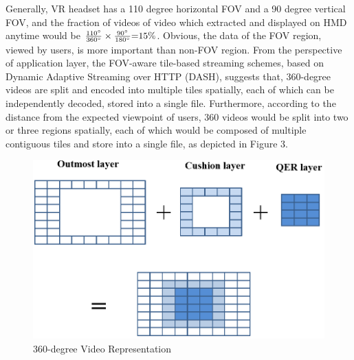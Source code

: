 



	Generally, VR headset has a 110 degree horizontal FOV and a 90 degree vertical FOV, and the fraction of videos of video which extracted and displayed on HMD anytime would be $\frac{{110^\circ }}{{360^\circ }} \times \frac{{90^\circ }}{{180^\circ }}{\rm{ = }}15{\rm{\% }}$. Obvious, the data of the FOV region, viewed by users, is more important than non-FOV region.
	From the perspective of application layer, the FOV-aware tile-based streaming schemes, based on Dynamic Adaptive Streaming over HTTP (DASH), suggests that, 360-degree videos are split and encoded into multiple tiles spatially, each of which can be independently decoded, stored into a single file. Furthermore, according to the distance from the expected viewpoint of users, 360 videos would be split into two or three regions spatially, each of which would be composed of multiple contiguous tiles and store into a single file, as depicted in Figure 3.
	
	\begin{figure}[ht]
		\centering
		\includegraphics[scale=0.2]{paper_figs/tileSplit.png}
		\caption{360-degree Video Representation}
		\label{paper_figs:pathdemo}
	\end{figure}	
	
